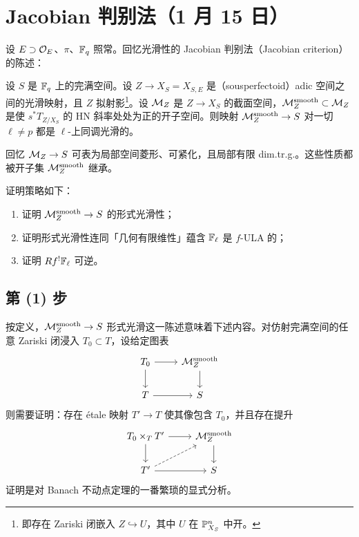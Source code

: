 \section[Jacobian 判别法]{Jacobian 判别法（1 月 15 日）}



设 $E\supset\mathcal{O}_E$、$\pi$、$\mathbb{F}_q$ 照常。回忆光滑性的 Jacobian 判别法（Jacobian criterion）的陈述：

\begin{theorem}
设 $S$ 是 $\mathbb{F}_q$ 上的完满空间。设 $Z\to X_S=X_{S,E}$ 是（sousperfectoid）adic 空间之间的光滑映射，且 $Z$ 拟射影\footnote{即存在 Zariski 闭嵌入 $Z\hookrightarrow U$，其中 $U$ 在 $\mathbb{P}^n_{X_S}$ 中开。}。设 $\mathcal{M}_Z$ 是 $Z\to X_S$ 的截面空间，$\mathcal{M}_Z^{\mathrm{smooth}}\subset\mathcal{M}_Z$ 是使 $s^*T_{Z/X_S}$ 的 HN 斜率处处为正的开子空间。则映射 $\mathcal{M}_Z^{\mathrm{smooth}}\to S$ 对一切 $\ell\ne p$ 都是 $\ell$-上同调光滑的。
\end{theorem}

\begin{remark}
回忆 $\mathcal{M}_Z\to S$ 可表为局部空间菱形、可紧化，且局部有限 dim.tr.g.。这些性质都被开子集 $\mathcal{M}_Z^{\mathrm{smooth}}$ 继承。
\end{remark}

证明策略如下：
\begin{enumerate}[label=(\arabic*)]
\item 证明 $\mathcal{M}_Z^{\mathrm{smooth}}\to S$ 的形式光滑性；
\item 证明形式光滑性连同「几何有限维性」蕴含 $\mathbb{F}_\ell$ 是 $f$-ULA 的；
\item 证明 $Rf^!\mathbb{F}_\ell$ 可逆。
\end{enumerate}

\subsection{第 (1) 步}

按定义，$\mathcal{M}_Z^{\mathrm{smooth}}\to S$ 形式光滑这一陈述意味着下述内容。对仿射完满空间的任意 Zariski 闭浸入 $T_0\subset T$，设给定图表
\[
\begin{tikzcd}
T_0 \arrow[r] \arrow[d] & \cM_Z^{\mathrm{smooth}} \arrow[d] \\
T \arrow[r] & S
\end{tikzcd}
\]
则需要证明：存在 étale 映射 $T'\to T$ 使其像包含 $T_0$，并且存在提升
\[
\begin{tikzcd}
T_0\times_T T' \arrow[r] \arrow[d] & \cM_Z^{\mathrm{smooth}} \arrow[d] \\
T' \arrow[r] \arrow[ur, dashed] & S
\end{tikzcd}
\]
证明是对 Banach 不动点定理的一番繁琐的显式分析。

